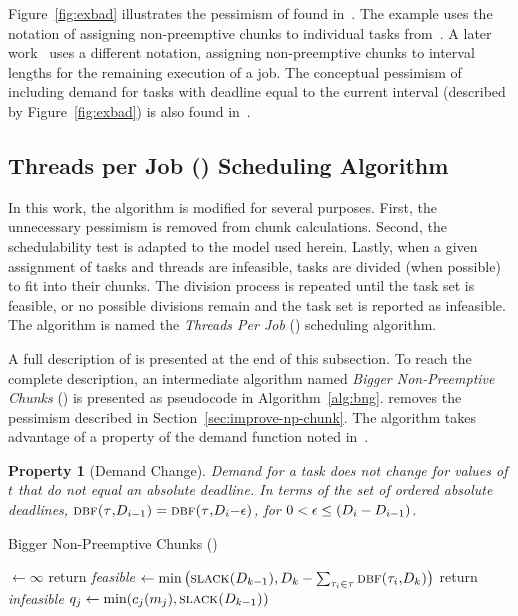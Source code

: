 \documentclass[a4paper,UKenglish,cleveref,autoref,english]{lipics-v2019}
\newtheorem{prop}{Property}
\begin{document}
Figure~\ref{fig:exbad} illustrates the pessimism of
\npchunks{} found in~\cite{Baruah:2005}. The
example uses the notation of assigning non-preemptive chunks to
individual tasks from~\cite{Baruah:2005}. A 
later work~\cite{Bertogna:2010} uses a different notation,
assigning non-preemptive chunks to interval lengths for the remaining
execution of a job. The conceptual pessimism of including demand for
tasks with deadline equal to the current interval (described by
Figure~\ref{fig:exbad}) is also found in~\cite{Bertogna:2010}. 


\subsection{Threads per Job (\tpj{}) Scheduling Algorithm}
\label{sec:tpj}

In this work, the \npchunks{} algorithm is modified for several
purposes. First, the unnecessary pessimism is removed from chunk
calculations. Second, the schedulability test is adapted to the model
used herein. Lastly, when a given assignment of tasks and threads are
infeasible, tasks are divided (when possible) to fit into their
chunks. The division process is repeated until the task set is
feasible, or no possible divisions remain and the task set is reported
as infeasible. The algorithm is named the \emph{Threads Per Job} (\tpj{})
scheduling algorithm.

A full description of \tpj{} is presented at the end of this
subsection. To reach the complete description, an intermediate
algorithm named \emph{Bigger Non-Preemptive Chunks} (\bng{}) is presented
as pseudocode in Algorithm~\ref{alg:bng}. \bng{} removes the
pessimism described in Section~\ref{sec:improve-np-chunk}. The
algorithm takes advantage of a property of the demand function 
 noted in~\cite{Baruah:2005}. 

\begin{prop}[Demand Change]\label{prop:dmnd}
Demand for a task does not change for values of ${t}$ that do not
equal an absolute deadline. In terms of the set of ordered absolute
deadlines,
${\text{\sc{dbf}(\ensuremath{\tau}{},\ensuremath{D_{i-1}})} =
  \text{\sc{dbf}(\ensuremath{\tau}{},\ensuremath{D_{i}}${ - \epsilon}$)}}$, for
${0 < \epsilon \le (D_{i} - D_{i-1})}$.
\end{prop}

\begin{algorithm}[h]
  \caption{Bigger Non-Preemptive Chunks (\bng{})}\label{alg:bng}
  \begin{algorithmic}[1]
    \State {} ${\gets \infty}$
        \State return \emph{feasible}
      \EndIf
      \State {} ${\gets \min
        \left(
          \text{\sc{slack}(${D_{k-1}}$)}, D_k - \sum_{\tau_{i} \in \tau}
          \text{\sc{dbf}(\ensuremath{\tau_{i}},${D_k}$)}
        \right)
        }$
        \State return \emph{infeasible}
      \EndIf
          \State ${q_j \gets \min(c_j(m_j), \text{\sc{slack}(${D_{k-1}}$))}}$
          \label{line:bng-improvement}
      \EndFor
    \EndFor
  \end{algorithmic}
\end{algorithm}
\end{document}
